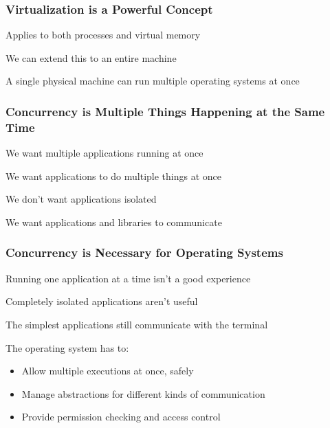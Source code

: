   \begin{frame}
    \frametitle{Virtualization is a Powerful Concept}

    Applies to both processes and virtual memory

    \vspace{4em}

    We can extend this to an entire machine

    \vspace{2em}

    A single physical machine can run multiple operating systems at once
  \end{frame}

  \begin{frame}
    \frametitle{Concurrency is Multiple Things Happening at the Same Time}

    We want multiple applications running at once

    \vspace{2em}

    We want applications to do multiple things at once

    \vspace{4em}

    We don't want applications isolated

    \vspace{2em}

    We want applications and libraries to communicate   
  \end{frame}

  \begin{frame}
    \frametitle{Concurrency is Necessary for Operating Systems}

    Running one application at a time isn't a good experience

    \vspace{2em}

    Completely isolated applications aren't useful

    \hspace{2em} The simplest applications still communicate with the terminal

    \vspace{4em}

    The operating system has to:
    \begin{itemize}
      \item Allow multiple executions at once, safely
      \item Manage abstractions for different kinds of communication
      \item Provide permission checking and access control
    \end{itemize}
  \end{frame}

